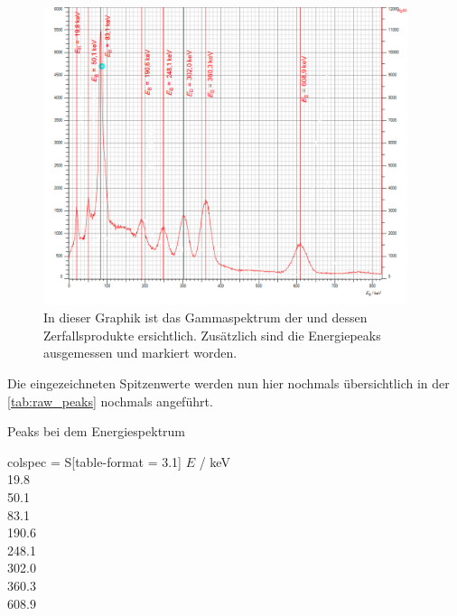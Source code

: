 \documentclass[12pt,english,ngerman]{scrartcl}
\begin{document}
\begin{figure}[H]
  \begin{center}
    \includegraphics[width = 0.95\textwidth]{figures/Ra226kennlinien.png}
  \end{center}
  \caption[Energiespektrum der $\gamma$-Strahlung einer  Probe]{
    In dieser Graphik ist das Gammaspektrum der  und dessen
    Zerfallsprodukte ersichtlich. Zusätzlich sind die Energiepeaks ausgemessen
    und markiert worden.
  }
  \label{fig:Ra226zerfallsreihe}
\end{figure}

Die eingezeichneten Spitzenwerte werden nun hier nochmals übersichtlich in der
\autoref{tab:raw_peaks} nochmals angeführt.

\begin{table}[H]
  \caption{Peaks bei dem  Energiespektrum}
  \label{tab:raw_peaks}
  \centering
  \begin{tblr}{colspec = {S[table-format = 3.1]}}
    {{{{ $E$ / \si{\kilo\electronvolt}}}}} \\
    19.8   \\
    50.1   \\
    83.1  \\
    190.6  \\
    248.1  \\
    302.0  \\
    360.3  \\
    608.9  \\
  \end{tblr}
\end{table}
\end{document}
